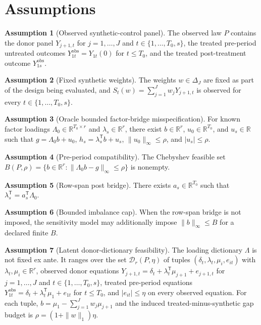 \documentclass[11pt]{article}
\newcommand{\transpose}{\mathsf{T}}
\newcommand{\R}{\mathbb{R}}
\theoremstyle{definition}
\newtheorem{assumption}{Assumption}
\theoremstyle{plain}
\theoremstyle{remark}
\begin{document}
\section{Assumptions}
\begin{assumption}[Observed synthetic-control panel]\label{ass:panel}
The observed law \(P\) contains the donor panel \(Y_{j+1,t}\) for \(j=1,\ldots,J\) and \(t\in\{1,\ldots,T_0,s\}\), the treated pre-period untreated outcomes \(Y^{\mathrm{obs}}_{1t}=Y_{1t}(0)\) for \(t\le T_0\), and the treated post-treatment outcome \(Y^{\mathrm{obs}}_{1s}\).
\end{assumption}

\begin{assumption}[Fixed synthetic weights]\label{ass:weights}
The weights \(w\in\Delta_J\) are fixed as part of the design being evaluated, and \(S_t(w)=\sum_{j=1}^Jw_jY_{j+1,t}\) is observed for every \(t\in\{1,\ldots,T_0,s\}\).
\end{assumption}

\begin{assumption}[Oracle bounded factor-bridge misspecification]\label{ass:oracle-budget}
For known factor loadings \(\Lambda_0\in\R^{T_0\times r}\) and \(\lambda_s\in\R^r\), there exist \(b\in\R^r\), \(u_0\in\R^{T_0}\), and \(u_s\in\R\) such that \(g=\Lambda_0b+u_0\), \(h_s=\lambda_s^\transpose b+u_s\), \(\|u_0\|_\infty\le\rho\), and \(|u_s|\le\rho\).
\end{assumption}

\begin{assumption}[Pre-period compatibility]\label{ass:compat}
The Chebyshev feasible set \(B(P,\rho)=\{b\in\R^r:\|\Lambda_0b-g\|_\infty\le\rho\}\) is nonempty.
\end{assumption}

\begin{assumption}[Row-span post bridge]\label{ass:rowspan}
There exists \(a_s\in\R^{T_0}\) such that \(\lambda_s^\transpose=a_s^\transpose\Lambda_0\).
\end{assumption}

\begin{assumption}[Bounded imbalance cap]\label{ass:imbalance-cap}
When the row-span bridge is not imposed, the sensitivity model may additionally impose \(\|b\|_\infty\le B\) for a declared finite \(B\).
\end{assumption}

\begin{assumption}[Latent donor-dictionary feasibility]\label{ass:latent-dictionary}
The loading dictionary \(\Lambda\) is not fixed ex ante. It ranges over the set \(\mathcal{D}_r(P,\eta)\) of tuples \((\delta_t,\lambda_t,\mu_i,e_{it})\) with \(\lambda_t,\mu_i\in\R^r\), observed donor equations \(Y_{j+1,t}=\delta_t+\lambda_t^\transpose\mu_{j+1}+e_{j+1,t}\) for \(j=1,\ldots,J\) and \(t\in\{1,\ldots,T_0,s\}\), treated pre-period equations \(Y^{\mathrm{obs}}_{1t}=\delta_t+\lambda_t^\transpose\mu_1+e_{1t}\) for \(t\le T_0\), and \(|e_{it}|\le\eta\) on every observed equation. For each tuple, \(b=\mu_1-\sum_{j=1}^Jw_j\mu_{j+1}\) and the induced treated-minus-synthetic gap budget is \(\rho=(1+\|w\|_1)\eta\).
\end{assumption}
\end{document}
